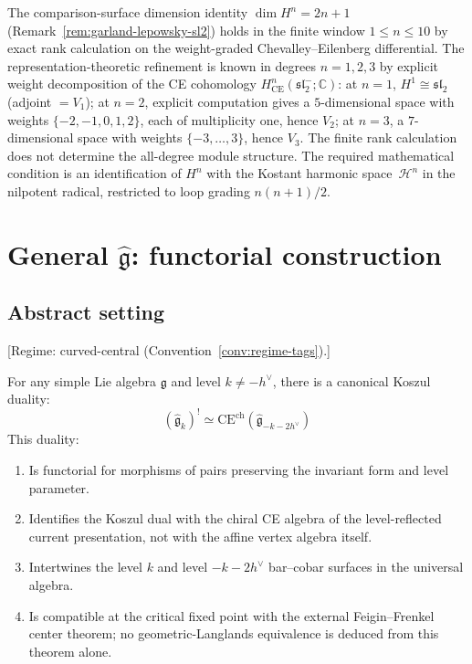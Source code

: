 \begin{remark}
\label{rem:sl2-bar-spin-evidence}
The comparison-surface dimension identity $\dim H^n = 2n + 1$
\textup{(}Remark~\textup{\ref{rem:garland-lepowsky-sl2}})
holds in the finite window \(1\leq n\leq10\) by exact rank calculation
on the weight-graded Chevalley--Eilenberg differential.  The
representation-theoretic refinement is known in degrees
$n=1,2,3$ by explicit weight decomposition of the CE cohomology
$H^n_{\mathrm{CE}}(\mathfrak{sl}_2^-; \mathbb{C})$:
at $n = 1$, $H^1 \cong \mathfrak{sl}_2$ (adjoint $= V_1$);
at $n = 2$, explicit computation gives a $5$-dimensional
space with weights $\{-2, -1, 0, 1, 2\}$, each of
multiplicity one, hence \(V_2\);
at $n = 3$, a $7$-dimensional space with weights
$\{-3, \ldots, 3\}$, hence \(V_3\).
The finite rank calculation does not determine the all-degree module
structure.  The required mathematical condition is an identification of \(H^n\)
with the Kostant harmonic space~\(\mathcal{H}^n\) in the nilpotent
radical, restricted to loop grading \(n(n+1)/2\).
\end{remark}

\section{\texorpdfstring{General $\widehat{\mathfrak{g}}$: functorial construction}{General g: functorial construction}}

\subsection{Abstract setting}

\begin{theorem}\label{thm:universal-kac-moody-koszul}
\textup{[Regime: curved-central
\textup{(}Convention~\textup{\ref{conv:regime-tags})}.]}

For any simple Lie algebra $\mathfrak{g}$ and level
$k \neq -h^\vee$, there is a canonical Koszul duality:
\begin{equation}
(\widehat{\mathfrak{g}}_k)^!
\simeq
\mathrm{CE}^{\mathrm{ch}}(\widehat{\mathfrak{g}}_{-k-2h^\vee})
\end{equation}
This duality:
\begin{enumerate}
\item Is functorial for morphisms of pairs preserving the invariant
form and level parameter.
\item Identifies the Koszul dual with the chiral CE algebra of the
level-reflected current presentation, not with the affine vertex
algebra itself.
\item Intertwines the level $k$ and level $-k-2h^\vee$ bar--cobar
surfaces in the universal algebra.
\item Is compatible at the critical fixed point with the external
Feigin--Frenkel center theorem; no geometric-Langlands equivalence is
deduced from this theorem alone.
\end{enumerate}
\end{theorem}

